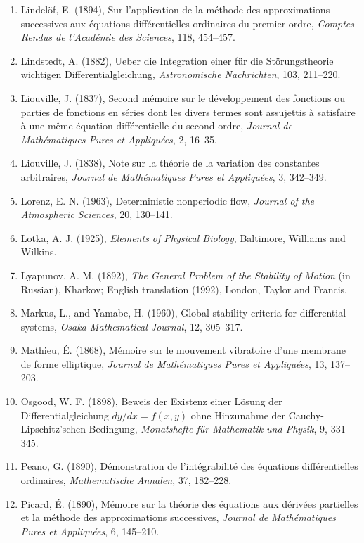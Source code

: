 \documentclass[11pt,a4paper]{article}
\numberwithin{equation}{section}
\theoremstyle{definition}
\begin{document}
\begin{enumerate}
\item Lindel\"of, E. (1894), Sur l'application de la m\'ethode des approximations successives aux \'equations diff\'erentielles ordinaires du
premier ordre, \emph{Comptes Rendus de l'Acad\'emie des Sciences}, 118, 454--457.
\item Lindstedt, A. (1882), Ueber die Integration einer f\"ur die St\"orungstheorie wichtigen Differentialgleichung, \emph{Astronomische Nachrichten},
103, 211--220.
\item Liouville, J. (1837), Second m\'emoire sur le d\'eveloppement des fonctions ou parties de fonctions en s\'eries dont les divers termes sont
assujettis \`a satisfaire \`a une m\^eme \'equation diff\'erentielle du second ordre, \emph{Journal de Math\'ematiques Pures et Appliqu\'ees}, 2, 16--35.
\item Liouville, J. (1838), Note sur la th\'eorie de la variation des constantes arbitraires, \emph{Journal de Math\'ematiques Pures et Appliqu\'ees}, 3,
342--349.
\item Lorenz, E. N. (1963), Deterministic nonperiodic flow, \emph{Journal of the Atmospheric Sciences}, 20, 130--141.
\item Lotka, A. J. (1925), \emph{Elements of Physical Biology}, Baltimore, Williams and Wilkins.
\item Lyapunov, A. M. (1892), \emph{The General Problem of the Stability of Motion} (in Russian), Kharkov; English translation (1992), London, Taylor and
Francis.
\item Markus, L., and Yamabe, H. (1960), Global stability criteria for differential systems, \emph{Osaka Mathematical Journal}, 12, 305--317.
\item Mathieu, \'E. (1868), M\'emoire sur le mouvement vibratoire d'une membrane de forme elliptique, \emph{Journal de Math\'ematiques Pures et
Appliqu\'ees}, 13, 137--203.
\item Osgood, W. F. (1898), Beweis der Existenz einer L\"osung der Differentialgleichung $dy/dx = f(x, y)$ ohne Hinzunahme der Cauchy-Lipschitz'schen
Bedingung, \emph{Monatshefte f\"ur Mathematik und Physik}, 9, 331--345.
\item Peano, G. (1890), D\'emonstration de l'int\'egrabilit\'e des \'equations diff\'erentielles ordinaires, \emph{Mathematische Annalen}, 37,
182--228.
\item Picard, \'E. (1890), M\'emoire sur la th\'eorie des \'equations aux d\'eriv\'ees partielles et la m\'ethode des approximations successives,
\emph{Journal de Math\'ematiques Pures et Appliqu\'ees}, 6, 145--210.

\end{enumerate}
\end{document}
